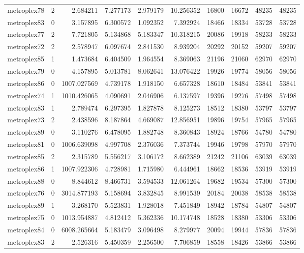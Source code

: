 \begin{longtable}{|l|r|r|r|r|r|r|r|r|r|}
metroplex78 & 2 & 2.684211 & 7.277173 & 2.979179 & 10.256352 & 16800 & 16672 & 48235 & 48235 \\
metroplex83 & 0 & 3.157895 & 6.300572 & 1.092352 & 7.392924 & 18466 & 18334 & 53728 & 53728 \\
metroplex77 & 2 & 7.721805 & 5.134868 & 5.183347 & 10.318215 & 20086 & 19918 & 58233 & 58233 \\
metroplex72 & 2 & 2.578947 & 6.097674 & 2.841530 & 8.939204 & 20292 & 20152 & 59207 & 59207 \\
metroplex85 & 1 & 1.473684 & 6.404509 & 1.964554 & 8.369063 & 21196 & 21060 & 62970 & 62970 \\
metroplex79 & 0 & 4.157895 & 5.013781 & 8.062641 & 13.076422 & 19926 & 19774 & 58056 & 58056 \\
metroplex86 & 0 & 1007.027569 & 4.739178 & 1.918150 & 6.657328 & 18610 & 18484 & 53841 & 53841 \\
metroplex74 & 1 & 1010.426065 & 4.090691 & 2.046906 & 6.137597 & 19396 & 19276 & 57498 & 57498 \\
metroplex83 & 1 & 2.789474 & 6.297395 & 1.827878 & 8.125273 & 18512 & 18380 & 53797 & 53797 \\
metroplex73 & 2 & 2.438596 & 8.187864 & 4.669087 & 12.856951 & 19896 & 19754 & 57965 & 57965 \\
metroplex89 & 0 & 3.110276 & 6.478095 & 1.882748 & 8.360843 & 18924 & 18766 & 54780 & 54780 \\
metroplex81 & 0 & 1006.639098 & 4.997708 & 2.376036 & 7.373744 & 19946 & 19798 & 57970 & 57970 \\
metroplex85 & 2 & 2.315789 & 5.556217 & 3.106172 & 8.662389 & 21242 & 21106 & 63039 & 63039 \\
metroplex86 & 1 & 1007.922306 & 4.728981 & 1.715980 & 6.444961 & 18662 & 18536 & 53919 & 53919 \\
metroplex88 & 0 & 8.844612 & 8.466731 & 3.594533 & 12.061264 & 19682 & 19534 & 57300 & 57300 \\
metroplex76 & 0 & 3014.877193 & 5.158694 & 3.832845 & 8.991539 & 20184 & 20038 & 58538 & 58538 \\
metroplex89 & 1 & 3.268170 & 5.523831 & 1.928018 & 7.451849 & 18942 & 18784 & 54807 & 54807 \\
metroplex75 & 0 & 1013.954887 & 4.812412 & 5.362336 & 10.174748 & 18528 & 18380 & 53306 & 53306 \\
metroplex84 & 0 & 6008.265664 & 5.183479 & 3.096498 & 8.279977 & 20094 & 19944 & 57836 & 57836 \\
metroplex83 & 2 & 2.526316 & 5.450359 & 2.256500 & 7.706859 & 18558 & 18426 & 53866 & 53866 \\

\end{longtable}
